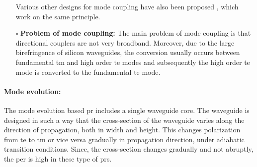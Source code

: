 \documentclass[../report.tex]{subfiles}
\begin{document}
\begin{itemize}[leftmargin=*]
	Various other designs for mode coupling have also been proposed \cite{wang_design_2014,ding_Integrated_2013}, which work on the same principle.
	
	\item[$\square$] \textbf{Problem of mode coupling:} The main problem of mode coupling is that directional couplers are not very broadband. Moreover, due to the large birefringence of silicon waveguides, the conversion usually occurs between fundamental \gls{tm} and high order \gls{te} modes and subsequently the high order \gls{te} mode is converted to the fundamental \gls{te} mode.
\end{itemize}		
			\paragraph*{Mode evolution:}
The mode evolution based \gls{pr} includes a single waveguide core. The waveguide is designed in such a way that the cross-section of the waveguide varies along the direction of propagation, both in width and height. This changes polarization from \gls{te} to \gls{tm} or vice versa gradually in propagation direction, under adiabatic transition conditions. Since, the cross-section changes gradually and not abruptly, the \gls{per} is high in these type of \gls{pr}s.
\end{document}
